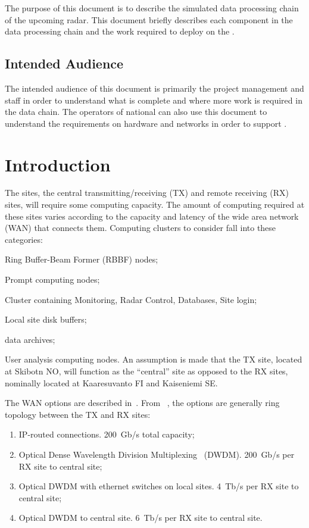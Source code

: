 \documentclass[12pt,a4paper]{article}
\begin{document}
The purpose of this document is to describe the simulated data processing chain of the upcoming \ED radar.
This document briefly describes each component in the data processing chain and the work required to deploy on the .

\subsection{Intended Audience}

The intended audience of this document is primarily the \ED project management and staff in order to understand what is complete and where more work is required in the data chain.
The operators of national  can also use this document to understand the requirements on hardware and networks in order to support \ED.

\section{Introduction}
\label{intro}

The \ED sites, the central transmitting/receiving (TX) and remote receiving (RX) sites, will require some computing capacity.
The amount of computing required at these sites varies according to the capacity and latency of the wide area network (WAN)
that connects them.
Computing clusters to consider fall into these categories:
\bitm
\item Ring Buffer-Beam Former (RBBF) nodes;
\item Prompt computing nodes;
\item Cluster containing Monitoring, Radar Control, Databases, Site login;
\item Local site disk buffers;
\item \ED data archives;
\item User analysis computing nodes.
  \eitm
An assumption is made that the TX site, located at Skibotn NO, will function as the ``central'' site as opposed to the RX sites, nominally located at Kaaresuvanto FI and Kaiseniemi SE.
  
The WAN options are described in~\cite{wan-options}.
From ~\cite{wan-options}, the options are generally ring topology between the TX and RX sites:
\begin{enumerate}
\item IP-routed connections. 200~Gb/s total capacity;
\item Optical Dense Wavelength Division Multiplexing~\cite{dwdm} (DWDM). 200~Gb/s per RX site to central site;
\item Optical DWDM with ethernet switches on local sites. 4~Tb/s per RX site to central site;
\item Optical DWDM to central site. 6~Tb/s per RX site to central site.
\end{enumerate}
\end{document}
